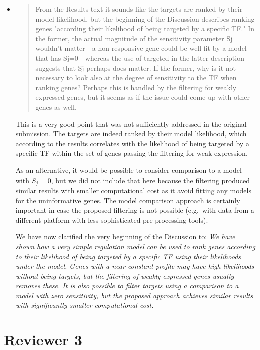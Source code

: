 \documentclass{article}
\begin{document}
\begin{itemize}
\item \begin{quote} From the Results text it sounds like the targets
    are ranked by their model likelihood, but the beginning of the
    Discussion describes ranking genes "according their likelihood of
    being targeted by a specific TF." In the former, the actual
    magnitude of the sensitivity parameter Sj wouldn't matter - a
    non-responsive gene could be well-fit by a model that has Sj=0 -
    whereas the use of targeted in the latter description suggests
    that Sj perhaps does matter. If the former, why is it not
    necessary to look also at the degree of sensitivity to the TF when
    ranking genes? Perhaps this is handled by the filtering for weakly
    expressed genes, but it seems as if the issue could come up with
    other genes as well.
\end{quote}

This is a very good point that was not sufficiently addressed in the
original submission.  The targets are indeed ranked by their model
likelihood, which according to the results correlates with the
likelihood of being targeted by a specific TF within the set of
genes passing the filtering for weak expression.

As an alternative, it would be possible to consider comparison to a
model with $S_j = 0$, but we did not include that here because the
filtering produced similar results with smaller computational cost as
it avoid fitting any models for the uninformative genes.  The model
comparison approach is certainly important in case the proposed
filtering is not possible (e.g.\ with data from a different platform
with less sophisticated pre-processing tools).

We have now clarified the very beginning of the Discussion to:
\emph{We have shown how a very simple regulation model can be used to rank
genes according to their likelihood of being targeted by a specific
TF using their likelihoods under the model.  Genes with a
near-constant profile may have high likelihoods without being targets,
but the filtering of weakly expressed genes usually removes these.  It
is also possible to filter targets using a comparison to a model with
zero sensitivity, but the proposed approach achieves similar results
with significantly smaller computational cost.}

\end{itemize}

\newpage

\section*{Reviewer 3}
\end{document}
